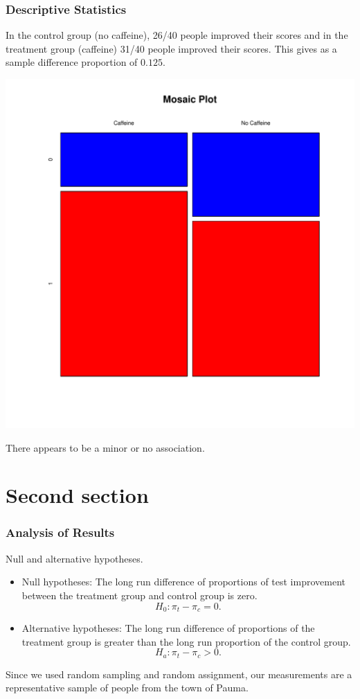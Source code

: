 \documentclass{beamer}
\begin{document}
\begin{frame}
\frametitle{Descriptive Statistics}
In the control group (no caffeine), 26/40 people improved their scores and in the treatment group (caffeine) 31/40 people improved their scores. This gives as a sample difference proportion of $0.125$.
\begin{center}
\includegraphics[scale = .3]{Rplots.pdf}
\end{center} \pause
There appears to be a minor or no association.
\end{frame}

\section{Second section}

\begin{frame}
\frametitle{Analysis of Results}
Null and alternative hypotheses.
\begin{itemize}
	\item Null hypotheses: The long run difference of proportions of test improvement between the treatment group and control group is zero.
		\[
			H_0: \pi_t - \pi_c = 0.
		\] \pause
	\item Alternative hypotheses: The long run difference of proportions of the treatment group is greater than the long run proportion of the control group.
		\[
			H_a: \pi_t - \pi_c > 0.
		\] \pause
\end{itemize}
Since we used random sampling and random assignment, our measurements are a representative sample of people from the town of Pauma.
\end{frame}
\end{document}
